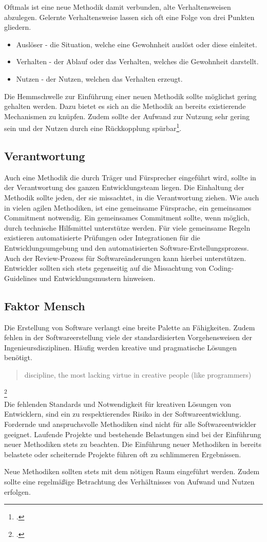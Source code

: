 Oftmals ist eine neue Methodik damit verbunden, alte Verhaltensweisen abzulegen.
Gelernte Verhaltensweise lassen sich oft eine Folge von drei Punkten gliedern.
\begin{itemize}
\item Auslöser - die Situation, welche eine Gewohnheit auslöst oder diese einleitet.
\item Verhalten - der Ablauf oder das Verhalten, welches die Gewohnheit darstellt.
\item Nutzen - der Nutzen, welchen das Verhalten erzeugt.
\end{itemize}
Die Hemmschwelle zur Einführung einer neuen Methodik sollte möglichst gering gehalten werden. Dazu bietet es sich an die Methodik an bereits existierende Mechanismen zu knüpfen. Zudem sollte der Aufwand zur Nutzung sehr gering sein und der Nutzen durch eine Rückkopplung spürbar\footcite[vgl.][]{steps-of-habit}.

\subsection{Verantwortung}

Auch eine Methodik die durch Träger und Fürsprecher eingeführt wird, sollte in der Verantwortung des ganzen Entwicklungsteam liegen. Die Einhaltung der Methodik sollte jeden, der sie missachtet, in die Verantwortung ziehen.
Wie auch in vielen agilen Methodiken, ist eine gemeinsame Fürsprache, ein gemeinsames \glqq Commitment\grqq{} notwendig. Ein gemeinsames Commitment sollte, wenn möglich, durch technische Hilfsmittel unterstütze werden. Für viele gemeinsame Regeln existieren automatisierte Prüfungen oder Integrationen für die Entwicklungsumgebung und den automatisierten Software-Erstellungsprozess.
Auch der Review-Prozess für Softwareänderungen kann hierbei unterstützen. Entwickler sollten sich stets gegenseitig auf die Missachtung von Coding-Guidelines und Entwicklungsmustern hinweisen.

\subsection{Faktor Mensch}

Die Erstellung von Software verlangt eine breite Palette an Fähigkeiten. Zudem fehlen in der Softwareerstellung viele der standardisierten Vorgehensweisen der Ingenieursdisziplinen. Häufig werden kreative und pragmatische Lösungen benötigt.

\blockquote {discipline, the most lacking virtue in creative people (like programmers)}\footcite[][S.167]{git-essentials-2017}
\vspace{1em}\\
Die fehlenden Standards und Notwendigkeit für kreativen Lösungen von Entwicklern, sind ein zu respektierendes Risiko in der Softwareentwicklung. Fordernde und anspruchsvolle Methodiken sind nicht für alle Softwareentwickler geeignet. Laufende Projekte und bestehende Belastungen sind bei der Einführung neuer Methodiken stets zu beachten. Die Einführung neuer Methodiken in bereits belastete oder scheiternde Projekte führen oft zu schlimmeren Ergebnissen.

Neue Methodiken sollten stets mit dem nötigen Raum eingeführt werden. Zudem sollte eine regelmäßige Betrachtung des Verhältnisses von Aufwand und Nutzen erfolgen.
